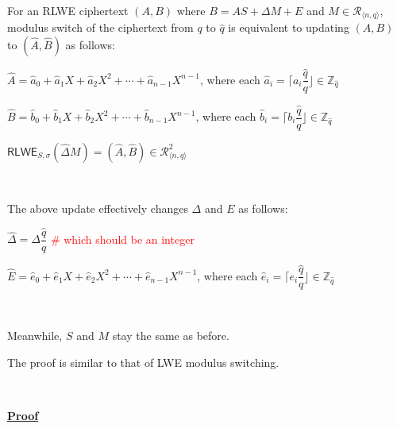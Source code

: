\begin{tcolorbox}[title={\textbf{\tboxlabel{\ref*{subsec:modulus-switch-rlwe}} RLWE Modulus Switching}}]

For an RLWE ciphertext $(A, B)$ where $B = AS + \Delta M + E$ and $M \in \mathcal{R}_{\langle n, q \rangle}$, modulus switch of the ciphertext from $q$ to $\hat q$ is equivalent to updating $(A, B)$ to $(\hat A, \hat B)$ as follows:


$\hat{A} = \hat{a}_0 + \hat{a}_1X + \hat{a}_2X^2 + \cdots + \hat{a}_{n-1}X^{n-1}$, where each $\hat{a}_i = \Big\lceil a_i\dfrac{\hat{q}}{q} \Big\rfloor \in \mathbb{Z}_{\hat{q}}$ 

$\hat{B} = \hat{b}_0 + \hat{b}_1X + \hat{b}_2X^2 + \cdots + \hat{b}_{n-1}X^{n-1}$, where each $\hat{b}_i = \Big\lceil b_i\dfrac{\hat{q}}{q} \Big\rfloor \in \mathbb{Z}_{\hat{q}}$

$\textsf{RLWE}_{{S},\sigma}(\hat{\Delta}  M) = (\hat{A}, \hat{B}) \in \mathcal{R}_{\langle n, q \rangle}^{2}$ 

$ $

The above update effectively changes $\Delta$ and $E$ as follows:

$\hat{\Delta} = \Delta\dfrac{\hat{q}}{q}$ \textcolor{red}{\# which should be an integer}

$\hat{E} = \hat{e}_0 + \hat{e}_1X + \hat{e}_2X^2 + \cdots + \hat{e}_{n-1}X^{n-1}$, where each $\hat{e}_i = \Big\lceil e_i\dfrac{\hat{q}}{q} \Big\rfloor \in \mathbb{Z}_{\hat{q}}$

$ $

Meanwhile, $S$ and $M$ stay the same as before.

\end{tcolorbox}

The proof is similar to that of LWE modulus switching.

$ $

\textbf{\underline{Proof}}

